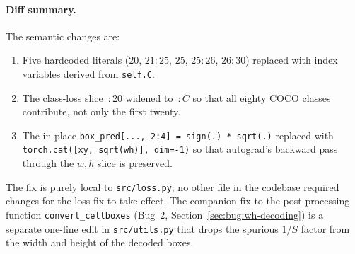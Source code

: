 \paragraph{Diff summary.} The semantic changes are:
\begin{enumerate}
    \item Five hardcoded literals
        ($20$, $21\!:\!25$, $25$, $25\!:\!26$, $26\!:\!30$) replaced with
        index variables derived from \texttt{self.C}.
    \item The class-loss slice $\,:\!20$ widened to $\,:\!C$ so that all
        eighty COCO classes contribute, not only the first twenty.
    \item The in-place
        \texttt{box\_pred[..., 2:4] = sign(.) * sqrt(.)} replaced with
        \texttt{torch.cat([xy, sqrt(wh)], dim=-1)} so that autograd's
        backward pass through the $w, h$ slice is preserved.
\end{enumerate}

\noindent The fix is purely local to \texttt{src/loss.py}; no other file in
the codebase required changes for the loss fix to take effect. The companion
fix to the post-processing function \texttt{convert\_cellboxes} (Bug~2,
Section~\ref{sec:bug:wh-decoding}) is a separate one-line edit in
\texttt{src/utils.py} that drops the spurious $1/S$ factor from the width
and height of the decoded boxes.
